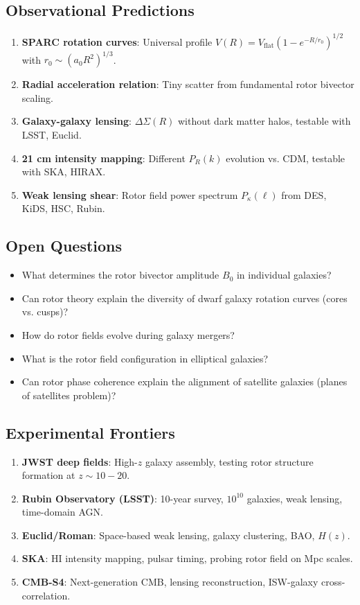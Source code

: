 \documentclass[12pt,a4paper]{article}
\theoremstyle{definition}
\theoremstyle{remark}
\begin{document}
\subsection{Observational Predictions}

\begin{enumerate}
\item \textbf{SPARC rotation curves}: Universal profile $V(R) = V_{\text{flat}}(1 - e^{-R/r_0})^{1/2}$ with $r_0 \sim (a_0 R^2)^{1/3}$.
\item \textbf{Radial acceleration relation}: Tiny scatter from fundamental rotor bivector scaling.
\item \textbf{Galaxy-galaxy lensing}: $\Delta\Sigma(R)$ without dark matter halos, testable with LSST, Euclid.
\item \textbf{21 cm intensity mapping}: Different $P_R(k)$ evolution vs. CDM, testable with SKA, HIRAX.
\item \textbf{Weak lensing shear}: Rotor field power spectrum $P_\kappa(\ell)$ from DES, KiDS, HSC, Rubin.
\end{enumerate}

\subsection{Open Questions}

\begin{itemize}
\item What determines the rotor bivector amplitude $B_0$ in individual galaxies?
\item Can rotor theory explain the diversity of dwarf galaxy rotation curves (cores vs. cusps)?
\item How do rotor fields evolve during galaxy mergers?
\item What is the rotor field configuration in elliptical galaxies?
\item Can rotor phase coherence explain the alignment of satellite galaxies (planes of satellites problem)?
\end{itemize}

\subsection{Experimental Frontiers}

\begin{enumerate}
\item \textbf{JWST deep fields}: High-$z$ galaxy assembly, testing rotor structure formation at $z \sim 10-20$.
\item \textbf{Rubin Observatory (LSST)}: 10-year survey, $10^{10}$ galaxies, weak lensing, time-domain AGN.
\item \textbf{Euclid/Roman}: Space-based weak lensing, galaxy clustering, BAO, $H(z)$.
\item \textbf{SKA}: HI intensity mapping, pulsar timing, probing rotor field on Mpc scales.
\item \textbf{CMB-S4}: Next-generation CMB, lensing reconstruction, ISW-galaxy cross-correlation.
\end{enumerate}
\end{document}
